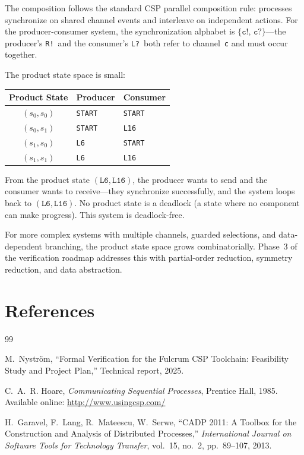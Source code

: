 \documentclass[11pt]{article}
\begin{document}
The composition follows the standard CSP parallel composition rule:
processes synchronize on shared channel events and interleave on
independent actions.  For the producer-consumer system, the
synchronization alphabet is $\{\texttt{c!},\, \texttt{c?}\}$---the
producer's \texttt{R!}\ and the consumer's \texttt{L?}\ both refer to
channel~\texttt{c} and must occur together.

The product state space is small:

\begin{center}
\begin{tabular}{cll}
\toprule
\textbf{Product State} & \textbf{Producer} & \textbf{Consumer} \\
\midrule
$(s_0, s_0)$  & \texttt{START} & \texttt{START} \\
$(s_0, s_1)$  & \texttt{START} & \texttt{L16} \\
$(s_1, s_0)$  & \texttt{L6}    & \texttt{START} \\
$(s_1, s_1)$  & \texttt{L6}    & \texttt{L16} \\
\bottomrule
\end{tabular}
\end{center}

From the product state $(\texttt{L6}, \texttt{L16})$, the producer
wants to send and the consumer wants to receive---they synchronize
successfully, and the system loops back to $(\texttt{L6},
\texttt{L16})$.  No product state is a deadlock (a state where no
component can make progress).  This system is deadlock-free.

For more complex systems with multiple channels, guarded selections,
and data-dependent branching, the product state space grows
combinatorially.  Phase~3 of the verification roadmap addresses this
with partial-order reduction, symmetry reduction, and data
abstraction.

\section{References}

\begin{thebibliography}{99}

M.~Nystr\"om,
``Formal Verification for the Fulcrum CSP Toolchain: Feasibility Study
and Project Plan,''
Technical report, 2025.

C.~A.~R. Hoare,
\emph{Communicating Sequential Processes},
Prentice Hall, 1985.
Available online: \url{http://www.usingcsp.com/}

H.~Garavel, F.~Lang, R.~Mateescu, W.~Serwe,
``CADP 2011: A Toolbox for the Construction and Analysis of
Distributed Processes,''
\emph{International Journal on Software Tools for Technology Transfer},
vol.~15, no.~2, pp.~89--107, 2013.

\end{thebibliography}
\end{document}
